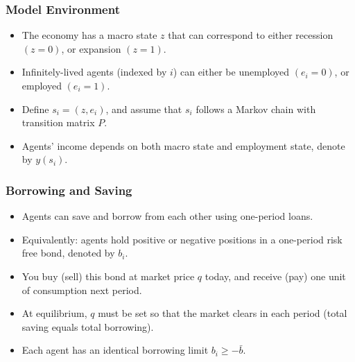\documentclass[handout]{beamer}
\newcommand{\E}{\mathbb{E}}
\theoremstyle{definition}
\begin{document}
\begin{frame}
  \frametitle{Model Environment}
  \begin{itemize}[<+->]
  \item The economy has a macro state $z$ that can correspond to either recession $(z = 0)$, or expansion $(z = 1)$.
  \item Infinitely-lived agents (indexed by $i$) can either be unemployed $(e_i = 0)$, or employed $(e_i = 1)$.
  \item Define $s_i = (z, e_i)$, and assume that $s_i$ follows a Markov chain with transition matrix $P$.
  \item Agents' income depends on both macro state and employment state, denote by $y(s_i)$.
  \end{itemize}
\end{frame}

\begin{frame}
  \frametitle{Borrowing and Saving}
  \begin{itemize}[<+->]
  \item Agents can save and borrow from each other using one-period loans.
  \item Equivalently: agents hold positive or negative positions in a one-period risk free bond, denoted by $b_i$.
  \item You buy (sell) this bond at market price $q$ today, and receive (pay) one unit of consumption next period.
  \item At equilibrium, $q$ must be set so that the market clears in each period (total saving equals total borrowing).
  \item Each agent has an identical borrowing limit $b_i \ge -\bar{b}$.
  \end{itemize}
\end{frame}

\end{document}
